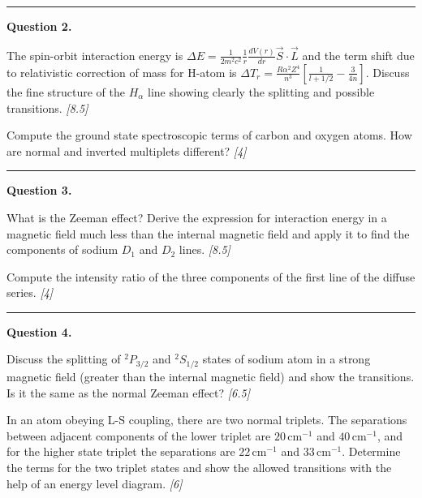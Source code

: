 \documentclass[11pt,a4paper]{article}
\newcommand{\pts}[1]{\hfill   \textit{[#1]}}
\begin{document}
\medskip\rule{\linewidth}{0.2pt}




\noindent   \textbf{Question 2.}

\begin{parts}
  \item The spin-orbit interaction energy is $\Delta E = \frac{1}{2m^2c^2} \frac{1}{r} \frac{dV(r)}{dr} \vec{S} \cdot \vec{L}$ and the term shift due to relativistic correction of mass for H-atom is $\Delta T_r = \frac{R\alpha^2 Z^4}{n^3} \left[ \frac{1}{l+1/2} - \frac{3}{4n} \right]$. Discuss the fine structure of the $H_\alpha$ line showing clearly the splitting and possible transitions. \pts{8.5}
  \item Compute the ground state spectroscopic terms of carbon and oxygen atoms. How are normal and inverted multiplets different? \pts{4}
\end{parts}

\medskip\rule{\linewidth}{0.2pt}




\noindent   \textbf{Question 3.}

\begin{parts}
  \item What is the Zeeman effect? Derive the expression for interaction energy in a magnetic field much less than the internal magnetic field and apply it to find the components of sodium $D_1$ and $D_2$ lines. \pts{8.5}
  \item Compute the intensity ratio of the three components of the first line of the diffuse series. \pts{4}
\end{parts}

\medskip\rule{\linewidth}{0.2pt}




\noindent   \textbf{Question 4.}

\begin{parts}
  \item Discuss the splitting of $^2P_{3/2}$ and $^2S_{1/2}$ states of sodium atom in a strong magnetic field (greater than the internal magnetic field) and show the transitions. Is it the same as the normal Zeeman effect? \pts{6.5}
  \item In an atom obeying L-S coupling, there are two normal triplets. The separations between adjacent components of the lower triplet are $20\, \text{cm}^{-1}$ and $40\, \text{cm}^{-1}$, and for the higher state triplet the separations are $22\, \text{cm}^{-1}$ and $33\, \text{cm}^{-1}$. Determine the terms for the two triplet states and show the allowed transitions with the help of an energy level diagram. \pts{6}
\end{parts}
\end{document}
